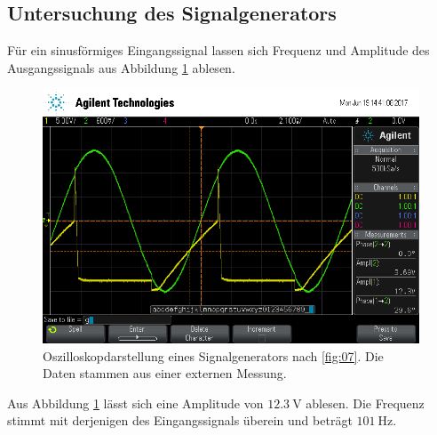 \subsection{Untersuchung des Signalgenerators}
Für ein sinusförmiges Eingangssignal lassen sich Frequenz und Amplitude des
Ausgangssignals aus Abbildung \ref{signalgenerator} ablesen.
\FloatBarrier
\begin{figure}
  \centering
  \includegraphics[scale=0.3]{ressources/signalgenerator.png}
  \caption{Oszilloskopdarstellung eines Signalgenerators nach \ref{fig:07}.
           Die Daten stammen aus einer externen Messung.}
  \label{signalgenerator}
\end{figure}
\FloatBarrier
\noindent Aus Abbildung \ref{signalgenerator} lässt sich eine Amplitude von
$\SI{12.3}{\volt}$ ablesen. Die Frequenz stimmt mit derjenigen des Eingangssignals
überein und beträgt $\SI{101}{\hertz}$.
